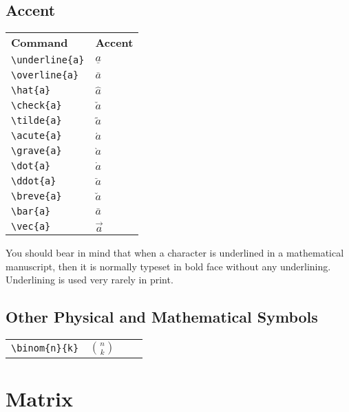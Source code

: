 \subsection{Accent}
\begin{table}[!htbp]
    \centering
    \begin{tabular}{ll}
	{\bf Command}	    & {\bf Accent}    \\
	\verb|\underline{a}|	& $\underline{a}$  \\
	\verb|\overline{a}|	& $\overline{a}$  \\
	\verb|\hat{a}|		& $\hat{a}$  \\
	\verb|\check{a}|	& $\check{a}$  \\
	\verb|\tilde{a}|	& $\tilde{a}$  \\
	\verb|\acute{a}|	& $\acute{a}$  \\
	\verb|\grave{a}|	& $\grave{a}$  \\
	\verb|\dot{a}|		& $\dot{a}$  \\
	\verb|\ddot{a}|		& $\ddot{a}$  \\
	\verb|\breve{a}|	& $\breve{a}$  \\
	\verb|\bar{a}|		& $\bar{a}$  \\
	\verb|\vec{a}|		& $\vec{a}$  \\
    \end{tabular}
\end{table}
You should bear in mind that when a character is underlined in a mathematical
manuscript, then it is normally typeset in bold face without any underlining. Underlining is used very rarely in print.

\subsection{Other Physical and Mathematical Symbols}
\begin{table}[!htbp]
    \centering
    \begin{tabular}{lp{2cm}lp{2cm}}
	\verb|\binom{n}{k}| & $\binom{n}{k}$	&   &	\\
    \end{tabular}
\end{table}

\newpage
\section{Matrix}
